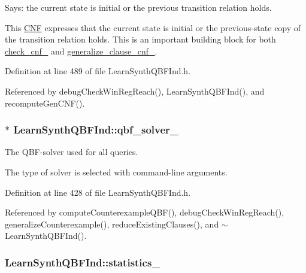 Says\-: the current state is initial or the previous transition relation holds. 

This \hyperlink{classCNF}{C\-N\-F} expresses that the current state is initial or the previous-\/state copy of the transition relation holds. This is an important building block for both \hyperlink{classLearnSynthQBFInd_ac90a4574da82c96888db219291368554}{check\-\_\-cnf\-\_\-} and \hyperlink{classLearnSynthQBFInd_ad61b112cfcc60506f7b21c9ea9267b37}{generalize\-\_\-clause\-\_\-cnf\-\_\-}. 

Definition at line 489 of file Learn\-Synth\-Q\-B\-F\-Ind.\-h.



Referenced by debug\-Check\-Win\-Reg\-Reach(), Learn\-Synth\-Q\-B\-F\-Ind(), and recompute\-Gen\-C\-N\-F().

\hypertarget{classLearnSynthQBFInd_ada2a2526b313b2ba4bb9d717fb63362d}{
\subsubsection[{qbf\-\_\-solver\-\_\-}]{$\ast$ Learn\-Synth\-Q\-B\-F\-Ind\-::qbf\-\_\-solver\-\_\-\hspace{0.3cm}{\ttfamily [protected]}}}\label{classLearnSynthQBFInd_ada2a2526b313b2ba4bb9d717fb63362d}


The Q\-B\-F-\/solver used for all queries. 

The type of solver is selected with command-\/line arguments. 

Definition at line 428 of file Learn\-Synth\-Q\-B\-F\-Ind.\-h.



Referenced by compute\-Counterexample\-Q\-B\-F(), debug\-Check\-Win\-Reg\-Reach(), generalize\-Counterexample(), reduce\-Existing\-Clauses(), and $\sim$\-Learn\-Synth\-Q\-B\-F\-Ind().

\hypertarget{classLearnSynthQBFInd_af83f4253aeedaed56cb789369b054724}{
\subsubsection[{statistics\-\_\-}]{ Learn\-Synth\-Q\-B\-F\-Ind\-::statistics\-\_\-\hspace{0.3cm}{\ttfamily [protected]}}}\label{classLearnSynthQBFInd_af83f4253aeedaed56cb789369b054724}


